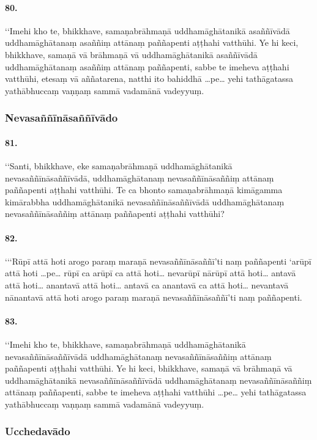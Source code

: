 \paragraph{80.}
‘‘Imehi kho te, bhikkhave, samaṇabrāhmaṇā uddhamāghātanikā asaññīvādā uddhamāghātanaṃ asaññiṃ attānaṃ paññapenti aṭṭhahi vatthūhi. Ye hi keci, bhikkhave, samaṇā vā brāhmaṇā vā uddhamāghātanikā asaññīvādā uddhamāghātanaṃ asaññiṃ attānaṃ paññapenti, sabbe te imeheva aṭṭhahi vatthūhi, etesaṃ vā aññatarena, natthi ito bahiddhā …pe… yehi tathāgatassa yathābhuccaṃ vaṇṇaṃ sammā vadamānā vadeyyuṃ.

\subsubsection{Nevasaññīnāsaññīvādo}

\paragraph{81.}
‘‘Santi, bhikkhave, eke samaṇabrāhmaṇā uddhamāghātanikā nevasaññīnāsaññīvādā, uddhamāghātanaṃ nevasaññīnāsaññiṃ attānaṃ paññapenti aṭṭhahi vatthūhi. Te ca bhonto samaṇabrāhmaṇā kimāgamma kimārabbha uddhamāghātanikā nevasaññīnāsaññīvādā uddhamāghātanaṃ nevasaññīnāsaññiṃ attānaṃ paññapenti aṭṭhahi vatthūhi?

\paragraph{82.}
‘‘‘Rūpī attā hoti arogo paraṃ maraṇā nevasaññīnāsaññī’ti naṃ paññapenti ‘arūpī attā hoti …pe… rūpī ca arūpī ca attā hoti… nevarūpī nārūpī attā hoti… antavā attā hoti… anantavā attā hoti… antavā ca anantavā ca attā hoti… nevantavā nānantavā attā hoti arogo paraṃ maraṇā nevasaññīnāsaññī’ti naṃ paññapenti.

\paragraph{83.}
‘‘Imehi kho te, bhikkhave, samaṇabrāhmaṇā uddhamāghātanikā nevasaññīnāsaññīvādā uddhamāghātanaṃ nevasaññīnāsaññiṃ attānaṃ paññapenti aṭṭhahi vatthūhi. Ye hi keci, bhikkhave, samaṇā vā brāhmaṇā vā uddhamāghātanikā nevasaññīnāsaññīvādā uddhamāghātanaṃ nevasaññīnāsaññiṃ attānaṃ paññapenti, sabbe te imeheva aṭṭhahi vatthūhi …pe… yehi tathāgatassa yathābhuccaṃ vaṇṇaṃ sammā vadamānā vadeyyuṃ.

\subsubsection{Ucchedavādo}

